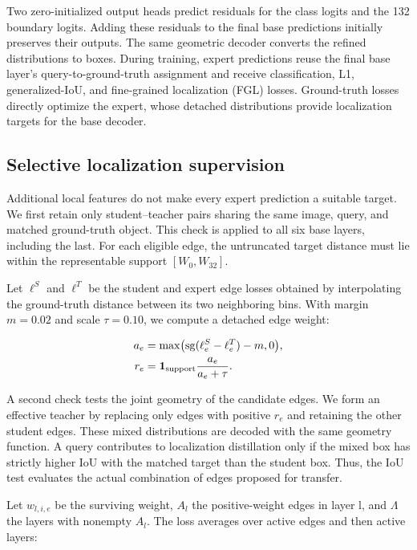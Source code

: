Two zero-initialized output heads predict residuals for the class logits and the 132 boundary logits. Adding these residuals to the final base predictions initially preserves their outputs. The same geometric decoder converts the refined distributions to boxes. During training, expert predictions reuse the final base layer's query-to-ground-truth assignment and receive classification, L1, generalized-IoU, and fine-grained localization (FGL) losses. Ground-truth losses directly optimize the expert, whose detached distributions provide localization targets for the base decoder.


\subsection{Selective localization supervision}

Additional local features do not make every expert prediction a suitable target. We first retain only student--teacher pairs sharing the same image, query, and matched ground-truth object. This check is applied to all six base layers, including the last. For each eligible edge, the untruncated target distance must lie within the representable support $[W_0,W_{32}]$.


Let $\ell^S$ and $\ell^T$ be the student and expert edge losses obtained by interpolating the ground-truth distance between its two neighboring bins. With margin $m=0.02$ and scale $\tau=0.10$, we compute a detached edge weight:


\begin{equation}\label{eq:edgegate}
\begin{aligned}
a_e&=\max\bigl(\operatorname{sg}(\ell^S_e-\ell^T_e)-m,0\bigr),\\
r_e&=\mathbf{1}_{\mathrm{support}}\frac{a_e}{a_e+\tau}.
\end{aligned}\end{equation}

A second check tests the joint geometry of the candidate edges. We form an effective teacher by replacing only edges with positive $r_e$ and retaining the other student edges. These mixed distributions are decoded with the same geometry function. A query contributes to localization distillation only if the mixed box has strictly higher IoU with the matched target than the student box. Thus, the IoU test evaluates the actual combination of edges proposed for transfer.


Let $w_{l,i,e}$ be the surviving weight, $A_l$ the positive-weight edges in layer l, and $\Lambda$ the layers with nonempty $A_l$. The loss averages over active edges and then active layers:


